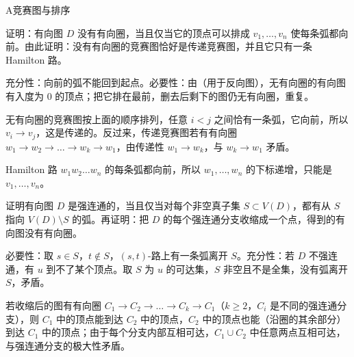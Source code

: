 \begin{exercises}{A}{竞赛图与排序}
\item\label{ex:orderings:A4} 证明：有向图 $D$ 没有有向圈，当且仅当它的顶点可以排成 $v_1,\dots,v_n$ 使每条弧都向前。由此证明：没有有向圈的竞赛图恰好是传递竞赛图，并且它只有一条 Hamilton 路。
\begin{solution}
充分性：向前的弧不能回到起点。必要性：由（用于反向图），无有向圈的有向图有入度为 $0$ 的顶点；把它排在最前，删去后剩下的图仍无有向圈，重复。

无有向圈的竞赛图按上面的顺序排列，任意 $i<j$ 之间恰有一条弧，它向前，所以 $v_i\to v_j$，这是传递的。反过来，传递竞赛图若有有向圈 $w_1\to w_2\to\dots\to w_k\to w_1$，由传递性 $w_1\to w_k$，与 $w_k\to w_1$ 矛盾。

Hamilton 路 $w_1w_2\dots w_n$ 的每条弧都向前，所以 $w_1,\dots,w_n$ 的下标递增，只能是 $v_1,\dots,v_n$。
\end{solution}

\item\label{ex:orderings:A5} 证明有向图 $D$ 是强连通的，当且仅当对每个非空真子集 $S\subset V(D)$，都有从 $S$ 指向 $V(D)\setminus S$ 的弧。再证明：把 $D$ 的每个强连通分支收缩成一个点，得到的有向图没有有向圈。
\begin{solution}
必要性：取 $s\in S$，$t\notin S$，$(s,t)$-路上有一条弧离开 $S$。充分性：若 $D$ 不强连通，有 $u$ 到不了某个顶点。取 $S$ 为 $u$ 的可达集，$S$ 非空且不是全集，没有弧离开 $S$，矛盾。

若收缩后的图有有向圈 $C_1\to C_2\to\dots\to C_k\to C_1$（$k\geqslant2$，$C_i$ 是不同的强连通分支），则 $C_1$ 中的顶点能到达 $C_2$ 中的顶点，$C_2$ 中的顶点也能（沿圈的其余部分）到达 $C_1$ 中的顶点；由于每个分支内部互相可达，$C_1\cup C_2$ 中任意两点互相可达，与强连通分支的极大性矛盾。
\end{solution}
\end{exercises}
